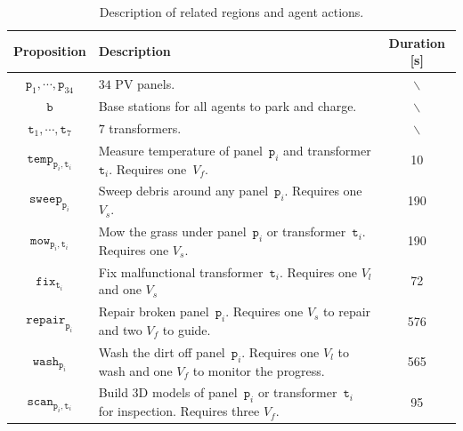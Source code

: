 \begin{table}[t]
 \centering
\caption{Description of related regions and agent actions.}
\label{fig:symbols}
\begin{tabular}{|c|m{}|c|}\hline
\textbf{Proposition} & \textbf{Description}\centering & \textbf{Duration} [s]\\ \hline
$\texttt{p}_1,\cdots,\texttt{p}_{34}$ & $34$ PV panels. & $\backslash$ \\ \hline
$\texttt{b}$ & Base stations for all agents to park and charge. & $\backslash$ \\ \hline
$\texttt{t}_1,\cdots,\texttt{t}_7$ & $7$ transformers. & $\backslash$ \\ \hline
$\texttt{temp}_{\texttt{p}_i,\texttt{t}_i}$ &
Measure temperature of panel~$\texttt{p}_i$ and transformer $\texttt{t}_i$.
Requires one~$V_f$. & 10 \\ \hline
$\texttt{sweep}_{\texttt{p}_i}$& Sweep debris around any panel~$\texttt{p}_i$.
Requires one $V_s$. & 190\\ \hline
$\texttt{mow}_{\texttt{p}_i,\texttt{t}_i}$ &
Mow the grass under panel~$\texttt{p}_i$ or transformer~$\texttt{t}_i$.
Requires one $V_s$. & 190\\ \hline
$\texttt{fix}_{\texttt{t}_i}$ &
Fix malfunctional transformer~$\texttt{t}_i$.
Requires one $V_l$ and one $V_s$ & 72\\ \hline
$\texttt{repair}_{\texttt{p}_i}$ &
Repair broken panel~$\texttt{p}_i$.
Requires one $V_s$ to repair and two $V_f$ to guide. & 576\\ \hline
$\texttt{wash}_{\texttt{p}_i}$ &
Wash the dirt off panel~$\texttt{p}_i$.
Requires one $V_l$ to wash and one $V_f$ to monitor the progress. & 565\\ \hline
$\texttt{scan}_{\texttt{p}_i,\texttt{t}_i}$ &
Build 3D models of panel~$\texttt{p}_i$ or transformer~$\texttt{t}_i$
for inspection. Requires three $V_f$. & 95\\ \hline
\end{tabular}
\end{table}


